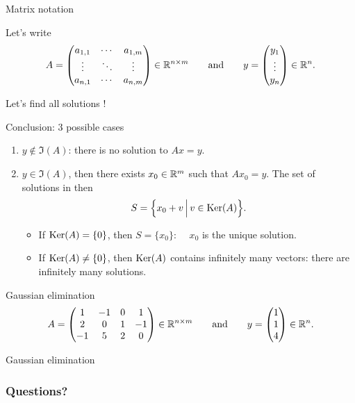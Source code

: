 \documentclass{beamer}
\begin{document}
\begin{frame}[t]{Matrix notation}
	\grid

	\vspace{-0.3cm}
	Let's write
	$$
	A = 
	\begin{pmatrix}
		a_{1,1}  & \cdots & a_{1,m} \\
		\vdots & \ddots & \vdots \\
		a_{n,1} & \cdots & a_{n,m} \\
	\end{pmatrix} \in \mathbb{R}^{n \times m}
	\qquad \text{and} \qquad
	y = 
	\begin{pmatrix}
		y_1 \\
		\vdots \\
		y_n
	\end{pmatrix}
	\in \mathbb{R}^n.
	$$
\end{frame}

\begin{frame}[t]{Let's find all solutions !}
	\grid

\end{frame}
\begin{frame}[t]{Conclusion: 3 possible cases}
	\grid

	\begin{enumerate}
		\item $y \not \in \Im(A)$: there is no solution to $Ax = y$.
			\vspace{0.4cm}
		\item $y \in \Im(A)$, then there exists $x_0 \in \mathbb{R}^m$ such that $Ax_0 =y$. The set of solutions in then
			$$
			S = \Big\{ x_0 + v \, \Big| \, v \in {{\rm Ker}}(A) \Big\}.
			$$
			\begin{itemize}
				\item If ${{\rm Ker}}(A) = \{ 0 \}$, then $S = \{x_0\}$: \ \ $x_0$ is the unique solution.
			\vspace{0.4cm}
				\item If ${{\rm Ker}}(A) \neq \{ 0 \}$, then ${{\rm Ker}}(A)$ contains infinitely many vectors: there are infinitely many solutions.
			\end{itemize}
	\end{enumerate}

\end{frame}


\begin{frame}[t]{Gaussian elimination}
	\grid
	$$
	A = 
	\begin{pmatrix}
		1  & -1 & 0 & 1 \\
		2  & 0 & 1 & -1 \\
		-1  & 5 & 2 & 0 
	\end{pmatrix} \in \mathbb{R}^{n \times m}
	\qquad \text{and} \qquad
	y = 
	\begin{pmatrix}
		1 \\
		1 \\
		4
	\end{pmatrix}
	\in \mathbb{R}^n.
	$$

\end{frame}
\begin{frame}[t]{Gaussian elimination}
	\grid
	\pause
	\pause
\end{frame}
\appendix
\backupbegin
\begin{frame}[t]
	\frametitle{Questions?}
	\grid
	\pause
	\pause
\end{frame}
\backupend
\end{document}
